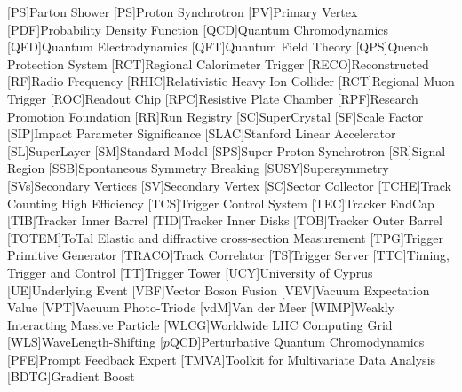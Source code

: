\begin{acronym}
  [PS]{Parton Shower}
  [PS]{Proton Synchrotron}
  [PV]{Primary Vertex}
  [PDF]{Probability Density Function}
  [QCD]{Quantum Chromodynamics}
  [QED]{Quantum Electrodynamics}
  [QFT]{Quantum Field Theory}
  [QPS]{Quench Protection System}
  [RCT]{Regional Calorimeter Trigger}
  [RECO]{Reconstructed}
  [RF]{Radio Frequency}
  [RHIC]{Relativistic Heavy Ion Collider}
  [RCT]{Regional Muon Trigger}
  [ROC]{Readout Chip}
  [RPC]{Resistive Plate Chamber}
  [RPF]{Research Promotion Foundation}
  [RR]{Run Registry}
  [SC]{SuperCrystal}
  [SF]{Scale Factor}
  [SIP]{Impact Parameter Significance}
  [SLAC]{Stanford Linear Accelerator}
  [SL]{SuperLayer}
  [SM]{Standard Model}
  [SPS]{Super Proton Synchrotron}
  [SR]{Signal Region}
  [SSB]{Spontaneous Symmetry Breaking}
  [SUSY]{Supersymmetry}
  [SVs]{Secondary Vertices}
  [SV]{Secondary Vertex}
  [SC]{Sector Collector}
  [TCHE]{Track Counting High Efficiency}
  [TCS]{Trigger Control System}
  [TEC]{Tracker EndCap}
  [TIB]{Tracker Inner Barrel}
  [TID]{Tracker Inner Disks}
  [TOB]{Tracker Outer Barrel}
  [TOTEM]{ToTal Elastic and diffractive cross-section Measurement}
  [TPG]{Trigger Primitive Generator}
  [TRACO]{Track Correlator}
  [TS]{Trigger Server}
  [TTC]{Timing, Trigger and Control}
  [TT]{Trigger Tower}
  [UCY]{University of Cyprus}
  [UE]{Underlying Event}
  [VBF]{Vector Boson Fusion}
  [VEV]{Vacuum Expectation Value}
  [VPT]{Vacuum Photo-Triode}
  [vdM]{Van der Meer}
  [WIMP]{Weakly Interacting Massive Particle}
  [WLCG]{Worldwide LHC Computing Grid}
  [WLS]{WaveLength-Shifting}
  [$p$QCD]{Perturbative Quantum Chromodynamics}
  [PFE]{Prompt Feedback Expert}
  [TMVA]{Toolkit for Multivariate Data Analysis}
  [BDTG]{Gradient Boost}
\end{acronym}

